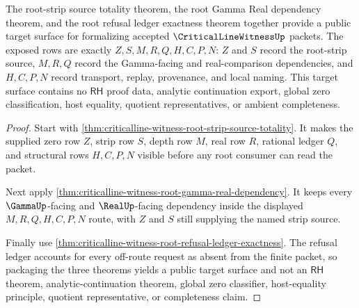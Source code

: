 \begin{theorem}
\label{thm:critical-line-witness-root-strip-public-target}
The root-strip source totality theorem, the root Gamma Real dependency theorem, and the root refusal ledger exactness theorem together provide a public target surface for formalizing accepted $\CriticalLineWitnessUp$ packets. The exposed rows are exactly $Z,S,M,R,Q,H,C,P,N$: $Z$ and $S$ record the root-strip source, $M,R,Q$ record the Gamma-facing and real-comparison dependencies, and $H,C,P,N$ record transport, replay, provenance, and local naming. This target surface contains no $\mathsf{RH}$ proof data, analytic continuation export, global zero classification, host equality, quotient representatives, or ambient completeness.
\end{theorem}
\begin{proof}
Start with \autoref{thm:criticalline-witness-root-strip-source-totality}. It makes the supplied zero row $Z$, strip row $S$, depth row $M$, real row $R$, rational ledger $Q$, and structural rows $H,C,P,N$ visible before any root consumer can read the packet.

Next apply \autoref{thm:criticalline-witness-root-gamma-real-dependency}. It keeps every $\GammaUp$-facing and $\RealUp$-facing dependency inside the displayed $M,R,Q,H,C,P,N$ route, with $Z$ and $S$ still supplying the named strip source.

Finally use \autoref{thm:criticalline-witness-root-refusal-ledger-exactness}. The refusal ledger accounts for every off-route request as absent from the finite packet, so packaging the three theorems yields a public target surface and not an $\mathsf{RH}$ theorem, analytic-continuation theorem, global zero classifier, host-equality principle, quotient representative, or completeness claim.
\end{proof}
